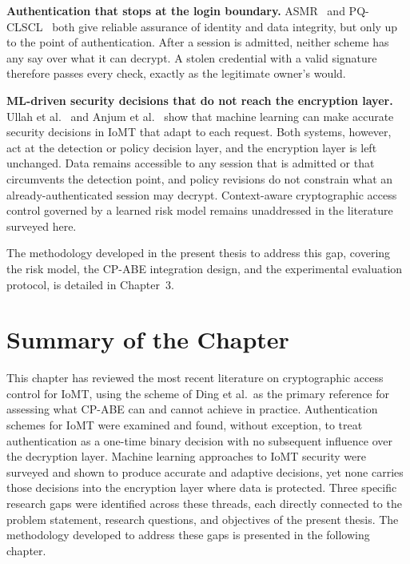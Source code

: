 \textbf{Authentication that stops at the login boundary.} ASMR~\cite{xu2025asmr} and PQ-CLSCL~\cite{xu2025pqclscl} both give reliable assurance of identity and data integrity, but only up to the point of authentication. After a session is admitted, neither scheme has any say over what it can decrypt. A stolen credential with a valid signature therefore passes every check, exactly as the legitimate owner's would.

\textbf{ML-driven security decisions that do not reach the encryption layer.} Ullah et al.~\cite{ullah2025interpretable} and Anjum et al.~\cite{anjum2025blockchain} show that machine learning can make accurate security decisions in IoMT that adapt to each request. Both systems, however, act at the detection or policy decision layer, and the encryption layer is left unchanged. Data remains accessible to any session that is admitted or that circumvents the detection point, and policy revisions do not constrain what an already-authenticated session may decrypt. Context-aware cryptographic access control governed by a learned risk model remains unaddressed in the literature surveyed here.


The methodology developed in the present thesis to address this gap, covering the risk model, the CP-ABE integration design, and the experimental evaluation protocol, is detailed in Chapter~3.

\section{Summary of the Chapter}
\label{sec:section_LitSum}

This chapter has reviewed the most recent literature on cryptographic access control for IoMT, using the scheme of Ding et al.\ as the primary reference for assessing what CP-ABE can and cannot achieve in practice. Authentication schemes for IoMT were examined and found, without exception, to treat authentication as a one-time binary decision with no subsequent influence over the decryption layer. Machine learning approaches to IoMT security were surveyed and shown to produce accurate and adaptive decisions, yet none carries those decisions into the encryption layer where data is protected. Three specific research gaps were identified across these threads, each directly connected to the problem statement, research questions, and objectives of the present thesis. The methodology developed to address these gaps is presented in the following chapter.
